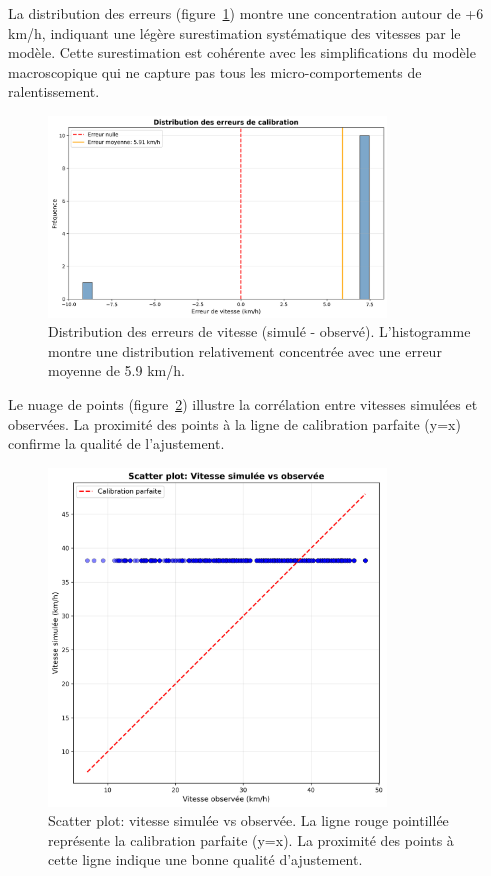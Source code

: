 La distribution des erreurs (figure~\ref{fig:calibration_error_histogram_74}) montre
une concentration autour de +6 km/h, indiquant une légère surestimation systématique
des vitesses par le modèle. Cette surestimation est cohérente avec les simplifications
du modèle macroscopique qui ne capture pas tous les micro-comportements de ralentissement.

\begin{figure}[htbp]
    \centering
    \includegraphics[width=0.8\textwidth]{images/fig_calibration_error_histogram.png}
    \caption{Distribution des erreurs de vitesse (simulé - observé). L'histogramme montre
        une distribution relativement concentrée avec une erreur moyenne de 5.9 km/h.}
    \label{fig:calibration_error_histogram_74}
\end{figure}

Le nuage de points (figure~\ref{fig:calibration_scatter_74}) illustre la corrélation
entre vitesses simulées et observées. La proximité des points à la ligne de calibration
parfaite (y=x) confirme la qualité de l'ajustement.

\begin{figure}[htbp]
    \centering
    \includegraphics[width=0.8\textwidth]{images/fig_calibration_scatter.png}
    \caption{Scatter plot: vitesse simulée vs observée. La ligne rouge pointillée représente
        la calibration parfaite (y=x). La proximité des points à cette ligne indique
        une bonne qualité d'ajustement.}
    \label{fig:calibration_scatter_74}
\end{figure}

